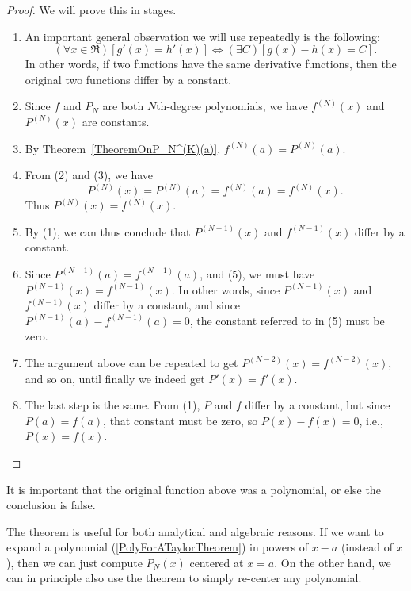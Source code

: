 \begin{proof}
We will prove this in stages.
\begin{enumerate}[(1)]
\item An important general observation we will use repeatedly 
is the following:
\begin{equation}
(\forall x\in\Re)[g'(x)=h'(x)]\iff (\exists C)[g(x)-h(x)=C].
\label{ObservationForTaylorTheoremProofForG'=H'}\end{equation}
In other words, if two functions have the same derivative functions,
then the original two functions differ by a constant.  
\item Since $f$ and $P_N$ are both $N$th-degree polynomials,
we have $f^{(N)}(x)$ and $P^{(N)}(x)$ are constants.
\item By Theorem~\ref{TheoremOnP_N^(K)(a)}, $f^{(N)}(a)=P^{(N)}(a)$.
\item From (2) and (3), we have  
\begin{equation}P^{(N)}(x)=P^{(N)}(a)=f^{(N)}(a)=f^{(N)}(x).
\end{equation}
Thus $P^{(N)}(x)=f^{(N)}(x).$
\item By (1), we can thus conclude that $P^{(N-1)}(x)$ and
     $f^{(N-1)}(x)$ differ by a constant.
\item Since $P^{(N-1)}(a)=f^{(N-1)}(a)$, and (5), we
       must have $P^{(N-1)}(x)=f^{(N-1)}(x)$.  In other
       words, since  $P^{(N-1)}(x)$ and
     $f^{(N-1)}(x)$ differ by a constant, and since
      $P^{(N-1)}(a)-f^{(N-1)}(a)=0$,
     the constant referred to in (5) must be zero.
\item The argument above can be repeated to get $P^{(N-2)}(x)=f^{(N-2)}(x)$,
      and so on, until finally we indeed get $P'(x)=f'(x)$.
\item The last step is the same. From (1), $P$ and $f$ 
      differ by a constant, but since $P(a)=f(a)$, that constant
      must be zero, so $P(x)-f(x)=0$, i.e., $P(x)=f(x)$.
\end{enumerate}

\end{proof}

It is important that the original function above was a polynomial,
or else the conclusion is false.

The theorem is useful for both analytical and algebraic reasons.
If we want to expand a polynomial (\ref{PolyForATaylorTheorem})
in powers of $x-a$ (instead of $x$), then we can just 
compute $P_N(x)$ centered at $x=a$.  On the other hand, 
we can in principle also use the theorem to simply re-center
any polynomial.



